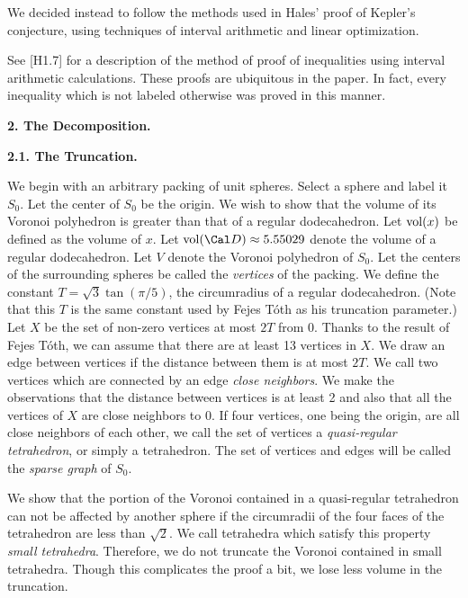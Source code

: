 We decided instead to follow the methods used in Hales' proof of Kepler's 
conjecture, using techniques of interval arithmetic and linear optimization.

See [H1.7] for a description of the method of proof of inequalities using interval arithmetic calculations.  These proofs are ubiquitous in the paper.  
In fact, every inequality which is not labeled otherwise was proved in this manner.  



\bigskip

\centerline {{ \bf 2. The Decomposition.}}

\bigskip

{\bf 2.1. The Truncation.}

We begin with an arbitrary packing of unit spheres.  Select a sphere and label it $S_0$.
  Let the center of $S_0$ be the origin.  We wish to show that the volume of its Voronoi 
polyhedron is greater than that of a regular dodecahedron.  
Let $\operatorname{vol}(x)$ be defined as the volume of $x$.  Let $\vol(\Cal D)\approx 5.55029$
 denote the volume of a regular dodecahedron.
Let $V$ denote the Voronoi polyhedron of $S_0$.
Let the centers of the surrounding spheres be called the {\it vertices} of the packing.
We define the constant $T=\sqrt 3 \tan(\pi/5)$, the circumradius of a regular dodecahedron.
(Note that this $T$ is the same constant used by Fejes T\'oth as his truncation parameter.)
Let $X$ be the set of non-zero vertices at most $2T$ from $0$.
Thanks to the result of Fejes T\'oth, we can assume that there are at least 13 vertices in $X$. 
 We draw an edge between vertices if the distance between them is at most $2T$. 
 We call two vertices which are connected by an edge {\it close neighbors}. 
 We make the observations that the distance between vertices is at least 2 and 
 also that all the vertices of $X$ are close neighbors to $0$.
  If four vertices, one being the origin, are all close neighbors of each other, we call the set of vertices a {\it quasi-regular tetrahedron}, or simply 
a tetrahedron.  
The set of vertices and edges will be called the {\it sparse graph} of $S_0$.

We show that the 
portion of the Voronoi contained in a quasi-regular tetrahedron can not be
affected by another sphere if the circumradii of the four faces of the tetrahedron are 
less than $\sqrt2$.  We call tetrahedra which satisfy this property {\it small tetrahedra}.
Therefore, we do not truncate the Voronoi contained in small tetrahedra.
Though this complicates the proof a bit, we lose less volume in the truncation.

